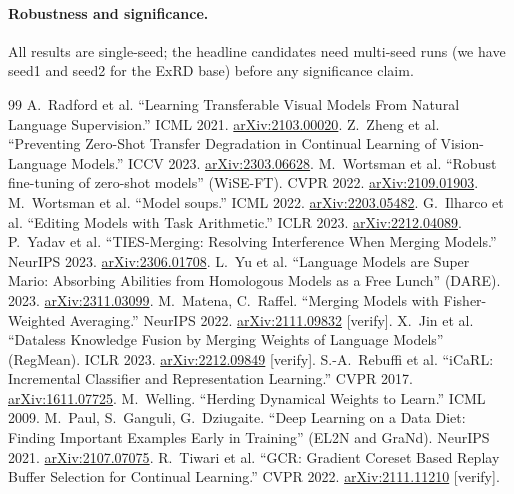 \documentclass[11pt]{article}
\begin{document}
\paragraph{Robustness and significance.} All results are single-seed; the headline candidates need
multi-seed runs (we have seed1 and seed2 for the ExRD base) before any significance claim.

\begin{thebibliography}{99}
\small
{} A.\ Radford et al. ``Learning Transferable Visual Models From Natural Language Supervision.'' ICML 2021. \href{https://arxiv.org/abs/2103.00020}{arXiv:2103.00020}.
 Z.\ Zheng et al. ``Preventing Zero-Shot Transfer Degradation in Continual Learning of Vision-Language Models.'' ICCV 2023. \href{https://arxiv.org/abs/2303.06628}{arXiv:2303.06628}.
 M.\ Wortsman et al. ``Robust fine-tuning of zero-shot models'' (WiSE-FT). CVPR 2022. \href{https://arxiv.org/abs/2109.01903}{arXiv:2109.01903}.
 M.\ Wortsman et al. ``Model soups.'' ICML 2022. \href{https://arxiv.org/abs/2203.05482}{arXiv:2203.05482}.
 G.\ Ilharco et al. ``Editing Models with Task Arithmetic.'' ICLR 2023. \href{https://arxiv.org/abs/2212.04089}{arXiv:2212.04089}.
 P.\ Yadav et al. ``TIES-Merging: Resolving Interference When Merging Models.'' NeurIPS 2023. \href{https://arxiv.org/abs/2306.01708}{arXiv:2306.01708}.
 L.\ Yu et al. ``Language Models are Super Mario: Absorbing Abilities from Homologous Models as a Free Lunch'' (DARE). 2023. \href{https://arxiv.org/abs/2311.03099}{arXiv:2311.03099}.
 M.\ Matena, C.\ Raffel. ``Merging Models with Fisher-Weighted Averaging.'' NeurIPS 2022. \href{https://arxiv.org/abs/2111.09832}{arXiv:2111.09832} [verify].
 X.\ Jin et al. ``Dataless Knowledge Fusion by Merging Weights of Language Models'' (RegMean). ICLR 2023. \href{https://arxiv.org/abs/2212.09849}{arXiv:2212.09849} [verify].
 S.-A.\ Rebuffi et al. ``iCaRL: Incremental Classifier and Representation Learning.'' CVPR 2017. \href{https://arxiv.org/abs/1611.07725}{arXiv:1611.07725}.
 M.\ Welling. ``Herding Dynamical Weights to Learn.'' ICML 2009.
 M.\ Paul, S.\ Ganguli, G.\ Dziugaite. ``Deep Learning on a Data Diet: Finding Important Examples Early in Training'' (EL2N and GraNd). NeurIPS 2021. \href{https://arxiv.org/abs/2107.07075}{arXiv:2107.07075}.
 R.\ Tiwari et al. ``GCR: Gradient Coreset Based Replay Buffer Selection for Continual Learning.'' CVPR 2022. \href{https://arxiv.org/abs/2111.11210}{arXiv:2111.11210} [verify].

\end{thebibliography}
\end{document}
